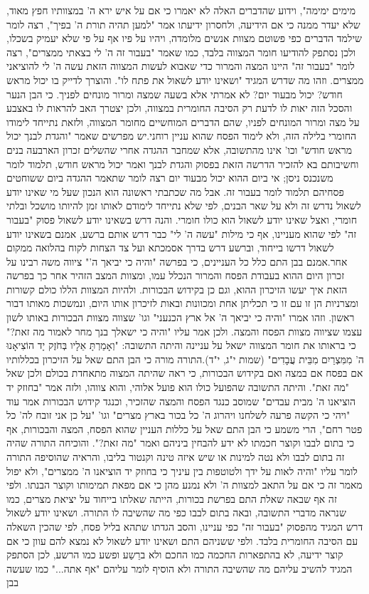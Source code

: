 \documentclass[12pt, openany]{book}
\begin{document}
מימים ימימה", וידוע שהדברים האלה לא יאמרו כי אם על איש ירא ה' במצוותיו חפץ מאוד, שלא יעדר ממנה כי אם הידיעה, ולחסרון ידיעתו אמר "למען תהיה תורת ה' בפיך", רצה לומר שילמד הדברים כפי פשוטם מצוות אנשים מלומדה, ויהיו על פיו אף על פי שלא יעמיק בשכלו, ולכן נסתפק להודיעו חומר המצווה בלבד, כמו שאמר "בעבור זה ה' לי בצאתי ממצרים", רצה לומר "בעבור זה" היינו המצה והמרור כדי שאבוא לעשות המצווה הזאת עשה ה' לי להוציאני ממצרים. וזהו מה שדרש המגיד "ושאינו יודע לשאול את פתח לו". והוצרך לדייק בו יכול מראש חודש? יכול מבעוד יום? לא אמרתי אלא בשעה שמצה ומרור מונחים לפניך. כי הבן הנער והסכל הזה יאות לו לדעת רק הסיבה החומרית במצווה, ולכן יצטרך האב להראות לו באצבע על מצה ומרור המונחים לפניו, שהם הדברים המוחשיים מחומר המצווה, ולזאת נתייחד לימודו החומרי בלילה הזה, ולא לימוד הפסח שהוא עניין רוחני.יש מפרשים שאמר "והגדת לבנך יכול מראש חודש" וכו' אינו מהתשובה, אלא שמחבר ההגדה אחרי שהשלים זכרון הארבעה בנים וחשיבותם בא להזכיר הדרשה הזאת בפסוק והגדת לבנך ואמר יכול מראש חודש, תלמוד לומר משנכנס ניסן; אי ביום ההוא יכול מבעוד יום רצה לומר שתאמר ההגדה ביום ששוחטים פסחיהם תלמוד לומר בעבור זה. אבל מה שכתבתי ראשונה הוא הנכון שעל מי שאינו יודע לשאול נדרש זה ולא על שאר הבנים, לפי שלא נתייחד לימודם לאותו זמן להיותו מושכל ובלתי חומרי, ואצל שאינו יודע לשאול הוא כולו חומרי. והנה דרש בשאינו יודע לשאול פסוק "בעבור זה" לפי שהוא מעניינו, אף כי מילות "עשה ה' לי" כבר דרש אותם ברשע, אמנם בשאינו יודע לשאול דרשו בייחוד, וברשע דרש בדרך אסמכתא ועל צד הצחות לקוח בהלואה ממקום אחר.אמנם בבן התם כלל כל העניינים, כי בפרשה "והיה כי יביאך ה'" ציווה משה רבינו על זכרון היום ההוא בעבודת הפסח והמרור הנכלל עמו, ומצוות המצב הזהיר אחר כך בפרשה הזאת איך יעשו הזיכרון ההוא, וגם כן בקידוש הבכורות. ולהיות המצוות הללו כולם קשורות ומצרניות הן זו עם זו כי תכליתן אחת ומכוונות ובאות לזיכרון אותו היום, ונמשכות מאותו דבור ראשון. וזהו אמרו "והיה כי יביאך ה' אל ארץ הכנעני" וגו' שצווה מצוות הבכורות באותו לשון עצמו שציווה מצוות הפסח והמצה. ולכן אמר עליו "והיה כי ישאלך בנך מחר לאמור מה זאת?" כי בראותו את חומר המצווה ישאל על עניינה והיתה התשובה: "וְאָמַרְתָּ אֵלָיו בְּחֹזֶק יָד הוֹצִיאָנוּ ה' מִמִּצְרַיִם מִבֵּית עֲבָדִים" (שמות י"ג, י"ד).התורה מורה כי הבן התם שאל על הזיכרון בכללותיו אם בפסח אם במצה ואם בקידוש הבכורות, כי ראה שהיתה המצוה מתאחדת בכולם ולכן שאל "מה זאת". והיתה התשובה שהפועל כולו הוא פועל אלוהי, והוא צווהו, ולזה אמר "בחוזק יד הוציאנו ה' מבית עבדים" שמוסב כנגד הפסח והמצה שהזכיר, וכנגד קידוש הבכורות אמר עוד "ויהי כי הקשה פרעה לשלחנו ויהרוג ה' כל בכור בארץ מצרים" וגו' "על כן אני זובח לה' כל פטר רחם", הרי משמע כי הבן התם שאל על כללות העניין שהוא הפסח, המצה והבכורות, אף כי בתום לבבו וקוצר חכמתו לא ידע להבחין ביניהם ואמר "מה זאת?". והוכיחה התורה שהיה זה בתום לבבו ולא נטה למינות או שיש איזה טינה וקנטור בליבו, והראיה שהוסיפה התורה לומר עליו "והיה לאות על ידך ולטוטפות בין עיניך כי בחוזק יד הוציאנו ה'  ממצרים", ולא יפול מאמר זה כי אם על התאב למצוות ה' ולא נמנע מהן כי אם מפאת תמימותו וקוצר הבנתו. ולפי זה אף שבאה שאלת התם בפרשת בכורות, הייתה שאלתו בייחוד על יציאת מצרים, כמו שנראה מדברי התשובה, ובאה בתום לבבו כפי מה שהשיבה לו התורה. ושאינו יודע לשאול דרש המגיד מהפסוק "בעבור זה" כפי עניינו, והסב הגדתו שתהא בליל פסח, לפי שהכין השאלה עם הסיבה החומרית בלבד. ולפי ששניהם התם ושאינו יודע לשאול לא נמצא להם עוון כי אם קוצר ידיעה, לא בהתפארות החכמה כמו החכם ולא ברֵשַע ופשע כמו הרשע, לכן הסתפק המגיד להשיב עליהם מה שהשיבה התורה ולא הוסיף לומר עליהם "אף אתה..." כמו שעשה בבן 
\end{document}
